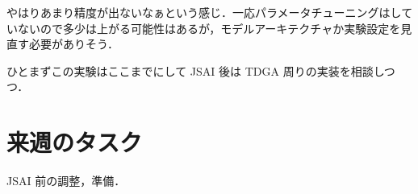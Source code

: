 \documentclass[onecolumn]{ujarticle}   %
\begin{document}
	やはりあまり精度が出ないなぁという感じ．一応パラメータチューニングはしていないので多少は上がる可能性はあるが，モデルアーキテクチャか実験設定を見直す必要がありそう．

	ひとまずこの実験はここまでにして JSAI 後は TDGA 周りの実装を相談しつつ．

	\section{来週のタスク}
	JSAI 前の調整，準備．

\end{document}
